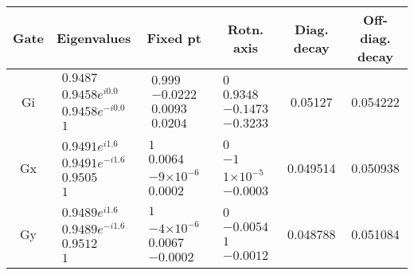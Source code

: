 \documentclass{article}[11pt]
\providecommand{\e}[1]{\ensuremath{\times 10^{#1}}}
\begin{document}
\begin{table}[h]
\small
\begin{center}
\begin{tabular}[l]{|c|c|c|c|c|c|}
\hline
Gate & Eigenvalues & Fixed pt & Rotn. axis & Diag. decay & Off-diag. decay \\ \hline
Gi & $ \begin{array}{c}
0.9487 \\ 
0.9458e^{i0.0} \\ 
0.9458e^{-i0.0} \\ 
1
 \end{array} $
 & $ \begin{array}{c}
0.999 \\ 
-0.0222 \\ 
0.0093 \\ 
0.0204
 \end{array} $
 & $ \begin{array}{c}
0 \\ 
0.9348 \\ 
-0.1473 \\ 
-0.3233
 \end{array} $
 & 0.05127 & 0.054222 \\ \hline
Gx & $ \begin{array}{c}
0.9491e^{i1.6} \\ 
0.9491e^{-i1.6} \\ 
0.9505 \\ 
1
 \end{array} $
 & $ \begin{array}{c}
1 \\ 
0.0064 \\ 
-9\e{-6} \\ 
0.0002
 \end{array} $
 & $ \begin{array}{c}
0 \\ 
-1 \\ 
1\e{-5} \\ 
-0.0003
 \end{array} $
 & 0.049514 & 0.050938 \\ \hline
Gy & $ \begin{array}{c}
0.9489e^{i1.6} \\ 
0.9489e^{-i1.6} \\ 
0.9512 \\ 
1
 \end{array} $
 & $ \begin{array}{c}
1 \\ 
-4\e{-6} \\ 
0.0067 \\ 
-0.0002
 \end{array} $
 & $ \begin{array}{c}
0 \\ 
-0.0054 \\ 
1 \\ 
-0.0012
 \end{array} $
 & 0.048788 & 0.051084 \\ \hline
\end{tabular}


\end{center}
\end{table}
\end{document}
